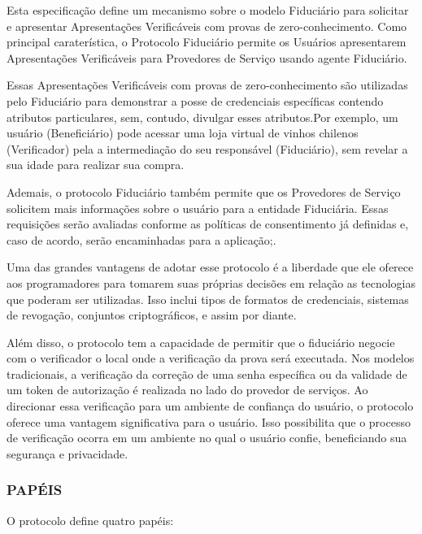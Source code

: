 Esta especificação define um mecanismo sobre o modelo Fiduciário para solicitar e apresentar Apresentações Verificáveis com provas de zero-conhecimento. Como principal caraterística, o Protocolo Fiduciário permite os Usuários apresentarem Apresentações Verificáveis para Provedores de Serviço usando agente Fiduciário. 

Essas Apresentações Verificáveis com provas de zero-conhecimento são utilizadas pelo Fiduciário para demonstrar a posse de credenciais específicas contendo atributos particulares, sem, contudo, divulgar esses atributos.Por exemplo, um usuário (Beneficiário) pode acessar uma loja virtual de vinhos chilenos (Verificador) pela a intermediação do seu responsável (Fiduciário), sem revelar a sua idade para realizar sua compra.


Ademais, o protocolo Fiduciário também permite que os Provedores de Serviço solicitem mais informações sobre o usuário para a entidade Fiduciária. Essas requisições serão avaliadas conforme as políticas de consentimento já definidas e, caso de acordo, serão encaminhadas para a aplicação;.

Uma das grandes vantagens de adotar esse protocolo  é a liberdade que ele oferece aos programadores para tomarem suas próprias decisões em relação as tecnologias que poderam ser utilizadas. Isso inclui tipos de formatos de credenciais, sistemas de revogação, conjuntos criptográficos, e assim por diante.


Além disso, o protocolo tem a capacidade de permitir que o fiduciário negocie com o verificador o local onde a verificação da prova será executada. Nos modelos tradicionais, a verificação da correção de uma senha específica ou da validade de um token de autorização é realizada no lado do provedor de serviços. Ao direcionar essa verificação para um ambiente de confiança do usuário, o protocolo oferece uma vantagem significativa para o usuário. Isso possibilita que o processo de verificação ocorra em um ambiente no qual o usuário confie, beneficiando sua segurança e privacidade.


\subsubsection{PAPÉIS}

O protocolo define quatro papéis: 

